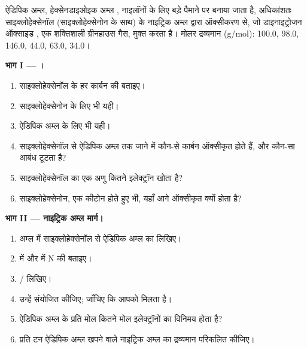 \begin{problem}
\label{pb:b1:organic-redox:1}
ऐडिपिक अम्ल, हेक्सेनडाइओइक अम्ल , नाइलॉनों के लिए बड़े पैमाने पर
बनाया जाता है, अधिकांशतः साइक्लोहेक्सेनॉल (साइक्लोहेक्सेनोन के साथ) के
नाइट्रिक अम्ल द्वारा ऑक्सीकरण से, जो डाइनाइट्रोजन ऑक्साइड , एक शक्तिशाली
ग्रीनहाउस गैस, मुक्त करता है। मोलर द्रव्यमान (\unit{g/mol}):  100.0,
 98.0,  146.0,  44.0,  63.0,
 34.0।

\medskip
\noindent\textbf{भाग I --- ।}
\begin{enumerate}
  \item साइक्लोहेक्सेनॉल के हर कार्बन की  बताइए।
  \item साइक्लोहेक्सेनोन के लिए भी यही।
  \item ऐडिपिक अम्ल के लिए भी यही।
  \item साइक्लोहेक्सेनॉल से ऐडिपिक अम्ल तक जाने में कौन-से कार्बन
        ऑक्सीकृत होते हैं, और कौन-सा आबंध टूटता है?
  \item साइक्लोहेक्सेनॉल का एक अणु कितने इलेक्ट्रॉन खोता है?
  \item साइक्लोहेक्सेनोन, एक कीटोन होते हुए भी, यहाँ आगे ऑक्सीकृत क्यों होता है?
\end{enumerate}

\medskip
\noindent\textbf{भाग II --- नाइट्रिक अम्ल मार्ग।}
\begin{enumerate}[resume]
  \item अम्ल में साइक्लोहेक्सेनॉल से ऐडिपिक अम्ल का  लिखिए।
  \item {} में और  में N की  बताइए।
  \item {} / लिखिए।
  \item उन्हें संयोजित कीजिए; जाँचिए कि आपको
         मिलता है।
  \item ऐडिपिक अम्ल के प्रति मोल कितने मोल इलेक्ट्रॉनों का
        विनिमय होता है?
  \item प्रति टन ऐडिपिक अम्ल खपने वाले नाइट्रिक अम्ल का द्रव्यमान परिकलित कीजिए।
\end{enumerate}


\end{problem}
